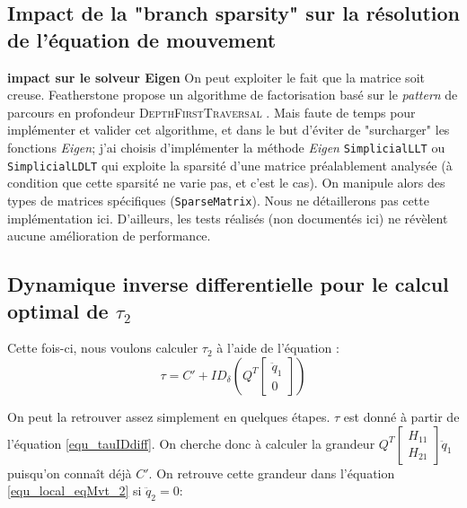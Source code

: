 \documentclass{report}
\begin{document}
\subsection{Impact de la "branch sparsity" sur la résolution de l'équation de mouvement}
\textbf{impact sur le solveur Eigen}
On peut exploiter le fait que la matrice soit creuse. Featherstone propose un algorithme de factorisation basé sur le \emph{pattern} de parcours en profondeur \textsc{DepthFirstTraversal} \cite[table 6.3 p112]{bib_featherstone}. Mais faute de temps pour implémenter et valider cet algorithme, et dans le but d'éviter de "surcharger" les fonctions \emph{Eigen}; j'ai choisis d'implémenter la méthode \emph{Eigen} \verb;SimplicialLLT; ou \verb;SimplicialLDLT; qui exploite la sparsité d'une matrice préalablement analysée (à condition que cette sparsité ne varie pas, et c'est le cas). On manipule alors des types de matrices spécifiques (\verb;SparseMatrix;). Nous ne détaillerons pas cette implémentation ici. D'ailleurs, les tests réalisés (non documentés ici) ne révèlent aucune amélioration de performance.


\subsection{Dynamique inverse differentielle pour le calcul optimal de $\tau_2$}

Cette fois-ci, nous voulons calculer $\tau_2$ à l'aide de l'équation \cite[p104,173]{bib_featherstone}:
\begin{equation}
\tau = C' + ID_{\delta} \left( Q^T \begin{bmatrix} 
                                     \ddot{q}_1 \\
                                     0 
                                   \end{bmatrix} \right) \label{equ_tauIDdiff_2}
\end{equation}

On peut la retrouver assez simplement en quelques étapes. $\tau$ est donné à partir de l'équation \ref{equ_tauIDdiff}. On cherche donc à calculer la grandeur $Q^T \begin{bmatrix}
                            H_{11} \\
                            H_{21}
                          \end{bmatrix} \ddot{q}_1$ puisqu'on connaît déjà $C'$. On retrouve cette grandeur dans l'équation \ref{equ_local_eqMvt_2} si $\ddot{q}_2 = 0$:
\end{document}
